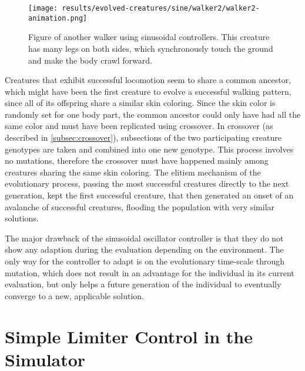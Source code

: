 \documentclass[main]{subfiles}
\begin{document}
\begin{figure}[tb]
\centering
\texttt{[image: results/evolved-creatures/sine/walker2/walker2-animation.png]}
\caption[Figure of another walker using sinusoidal controllers.]{Figure of another walker using sinusoidal controllers. This creature has many legs on both sides, which synchronously touch the ground and make the body crawl forward. }
\label{figure:successfulcreatures-walker2}
\end{figure}

Creatures that exhibit successful locomotion seem to share a common ancestor, which might have been the first creature to evolve a successful walking pattern, since all of its offspring share a similar skin coloring. %
%
Since the skin color is randomly set for one body part, the common ancestor could only have had all the same color and must have been replicated using crossover. %
%
In crossover (as described in \ref{subsec:crossover}), subsections of the two participating creature genotypes are taken and combined into one new genotype. %
%
This process involves no mutations, therefore the crossover must have happened mainly among creatures sharing the same skin coloring. %
%
The elitism mechanism of the evolutionary process, passing the most successful creatures directly to the next generation, kept the first successful creature, that then generated an onset of an avalanche of successful creatures, flooding the population with very similar solutions. 

The major drawback of the sinusoidal oscillator controller is that they do not show any adaption during the evaluation depending on the environment. %
%
The only way for the controller to adapt is on the evolutionary time-scale through mutation, which does not result in an advantage for the individual in its current evaluation, but only helps a future generation of the individual to eventually converge to a new, applicable solution. 

\section{Simple Limiter Control in the Simulator}
\end{document}
